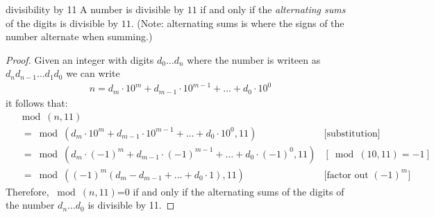 \begin{prop}{divisibility by 11}
A number is divisible by $11$ if and only if the \textit{alternating sums} of the digits is divisible by $11$. (Note: alternating sums is where the signs of the number alternate when summing.)
 
\begin{proof}
Given an integer with digits $d_{0}\dots d_{n}$ where the number is writeen as $d_{n}d_{n-1}\dots d_{1}d_{0}$ we can write
\begin{align*}
n=d_{m}\cdot 10^{m}+d_{m-1}\cdot 10^{m-1}+\dots +d_{0}\cdot 10^{0}
\end{align*} 
it follows that:
\begin{align*}
&\bmod(n,11) & \\
&~~=\bmod(d_{m}\cdot 10^{m}+d_{m-1}\cdot 10^{m-1}+\dots +d_{0}\cdot 10^{0},11) & \textrm{[substitution]}\\
&~~=\bmod(d_{m}\cdot (-1)^{m}+d_{m-1}\cdot (-1)^{m-1}+\dots+d_{0}\cdot (-1)^{0},11) & [\bmod(10,11)=-1]\\
&~~=\bmod \left( (-1)^m (d_m - d_{m-1}+\dots + d_{0}\cdot 1),11 \right) & \textrm{[factor out } (-1)^m]
\end{align*}
Therefore, $\bmod(n,11)$=0 if and only if the alternating sums of the digits of the number $d_{n}\dots d_{0}$ is divisible by 11.
\end{proof}
\end{prop}
